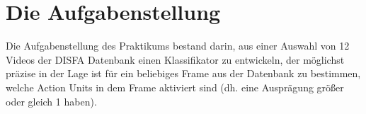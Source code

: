 \section{Die Aufgabenstellung}
Die Aufgabenstellung des Praktikums bestand darin, aus einer Auswahl von 12 Videos der DISFA Datenbank einen Klassifikator zu entwickeln,
der möglichst präzise in der Lage ist für ein beliebiges Frame aus der Datenbank zu bestimmen, welche Action Units in dem Frame aktiviert
sind (dh. eine Ausprägung größer oder gleich 1 haben).

